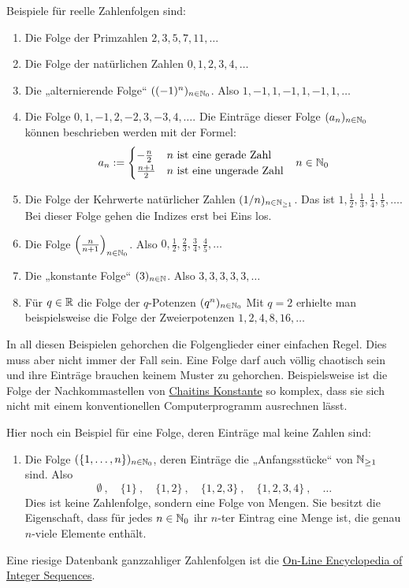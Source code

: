 \begin{bsp}
    Beispiele für reelle Zahlenfolgen sind:
    \begin{enumerate}
        \item Die Folge der Primzahlen $2,3,5,7,11,\dots$
        \item Die Folge der natürlichen Zahlen $0,1,2,3,4,\dots$
        \item Die „alternierende Folge“ $((-1)^n)_{n\in \mathbb N_0}$. Also $1,-1,1,-1,1,-1,1,\dots$
        \item Die Folge $0,1,-1,2,-2,3,-3,4,\dots$. Die Einträge dieser Folge $(a_n)_{n\in \mathbb N_0}$ können beschrieben werden mit der Formel:
        \begin{align*}
            a_n := \begin{cases}
                -\frac{n}{2} & n\ \text{ist eine gerade Zahl} \\
                \frac{n+1}{2} & n\ \text{ist eine ungerade Zahl}
            \end{cases} && n \in \mathbb N_0
        \end{align*}
        \item Die Folge der Kehrwerte natürlicher Zahlen $(1/n)_{n\in \mathbb N_{\ge 1}}$. Das ist  $1,\frac{1}{2},\frac{1}{3},\frac{1}{4},\frac{1}{5},\dots$. Bei dieser Folge gehen die Indizes erst bei Eins los.
        \item Die Folge $\left(\frac{n}{n+1}\right)_{n\in \mathbb N_0}$. Also $0,\frac{1}{2},\frac{2}{3},\frac{3}{4},\frac{4}{5},\dots$
        \item Die „konstante Folge“ $(3)_{n\in \mathbb N}$. Also $3,3,3,3,3,\dots$
        \item Für $q\in \mathbb R$ die Folge der $q$-Potenzen $(q^n)_{n\in \mathbb N_0}$ Mit $q=2$ erhielte man beispielsweise die Folge der Zweierpotenzen $1,2,4,8,16,\dots$
    \end{enumerate}
    In all diesen Beispielen gehorchen die Folgenglieder einer einfachen Regel. Dies muss aber nicht immer der Fall sein. Eine Folge darf auch völlig chaotisch sein und ihre Einträge brauchen keinem Muster zu gehorchen. Beispielsweise ist die Folge der Nachkommastellen von \href{https://de.wikipedia.org/wiki/Chaitinsche_Konstante}{Chaitins Konstante} so komplex, dass sie sich nicht mit einem konventionellen Computerprogramm ausrechnen lässt.
        
    Hier noch ein Beispiel für eine Folge, deren Einträge mal keine Zahlen sind:
    \begin{enumerate}[(9)]
        \item Die Folge $(\{1,\dots , n\})_{n\in \mathbb N_0}$, deren Einträge die „Anfangsstücke“ von $\mathbb N_{\ge 1}$ sind. Also
            \[ \emptyset\ ,\quad \{1\}\ ,\quad \{1,2\}\ ,\quad \{1,2,3\}\ ,\quad \{1,2,3,4\}\ , \quad \dots \]
        Dies ist keine Zahlenfolge, sondern eine Folge von Mengen. Sie besitzt die Eigenschaft, dass für jedes $n\in \mathbb N_0$ ihr $n$-ter Eintrag eine Menge ist, die genau $n$-viele Elemente enthält.
    \end{enumerate}
    Eine riesige Datenbank ganzzahliger Zahlenfolgen ist die \href{https://oeis.org/}{On-Line Encyclopedia of Integer Sequences}.
\end{bsp}



